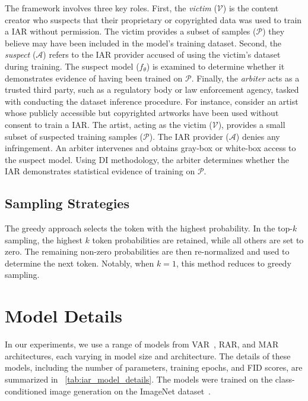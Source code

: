  The framework involves three key roles. First, the \textit{victim} ($\mathcal{V}$) is the content creator who suspects that their proprietary or copyrighted data was used to train a IAR without permission. The victim provides a subset of samples ($\mathcal{P}$) they believe may have been included in the model's training dataset. Second, the \textit{suspect} ($\mathcal{A}$) refers to the IAR provider accused of using the victim's dataset during training. The suspect model ($f_\theta$) is examined to determine whether it demonstrates evidence of having been trained on $\mathcal{P}$. Finally, the \textit{arbiter} acts as a trusted third party, such as a regulatory body or law enforcement agency, tasked with conducting the dataset inference procedure. 
For instance, consider an artist whose publicly accessible but copyrighted artworks have been used without consent to train a IAR. The artist, acting as the victim ($\mathcal{V}$), provides a small subset of suspected training samples ($\mathcal{P}$). The IAR provider ($\mathcal{A}$) denies any infringement. An arbiter intervenes and obtains gray-box or white-box access to the suspect model. Using DI methodology, the arbiter determines whether the IAR demonstrates statistical evidence of training on $\mathcal{P}$. 

\subsection{Sampling Strategies}

The greedy approach selects the token with the highest probability. In the top-$k$ sampling, the highest $k$ token probabilities are retained, while all others are set to zero. The remaining non-zero probabilities are then re-normalized and used to determine the next token. Notably, when $k=1$, this method reduces to greedy sampling.
\section{Model Details}
\label{app:model_details}
In our experiments, we use a range of models from VAR~\cite{var_tian2024visualautoregressivemodelingscalable}, RAR\cite{rar_yu2024randomizedautoregressivevisualgeneration}, and MAR~\cite{mar_li2024autoregressiveimagegenerationvector} architectures, each varying in model size and architecture. The details of these models, including the number of parameters, training epochs, and FID scores, are summarized in ~\cref{tab:iar_model_details}.
The models were trained on the class-conditioned image generation on the ImageNet dataset~\cite{deng2009imagenet}.

